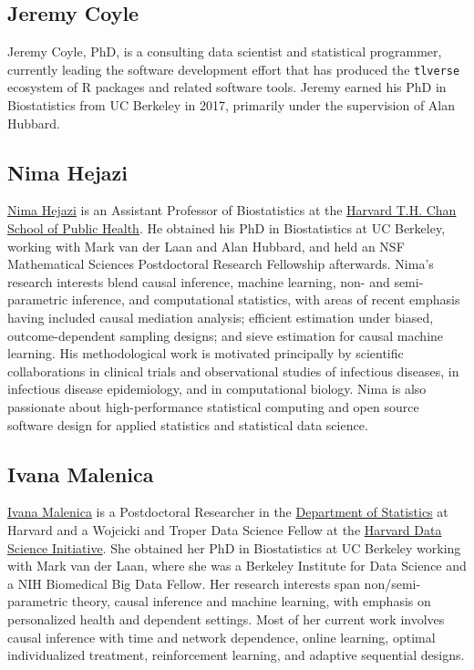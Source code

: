 \documentclass[
  12pt, krantz2,
]{krantz}
\newcommand{\passthrough}[1]{#1}
\newcommand{\1}{\mathbbm{1}}
\theoremstyle{definition}
\theoremstyle{definition}
\theoremstyle{definition}
\theoremstyle{definition}
\theoremstyle{remark}
\begin{document}
\hypertarget{jeremy-coyle}{%
\subsection*{Jeremy Coyle}\label{jeremy-coyle}}


Jeremy Coyle, PhD, is a consulting data scientist and statistical programmer,
currently leading the software development effort that has produced the
\passthrough{\lstinline!tlverse!} ecosystem of R packages and related software tools. Jeremy earned his
PhD in Biostatistics from UC Berkeley in 2017, primarily under the supervision
of Alan Hubbard.

\hypertarget{nima-hejazi}{%
\subsection*{Nima Hejazi}\label{nima-hejazi}}


\href{https://nimahejazi.org}{Nima Hejazi} is an Assistant Professor of Biostatistics
at the \href{https://www.hsph.harvard.edu/biostatistics/}{Harvard T.H. Chan School of Public
Health}. He obtained his PhD in
Biostatistics at UC Berkeley, working with Mark van der Laan and Alan Hubbard,
and held an NSF Mathematical Sciences Postdoctoral Research Fellowship
afterwards. Nima's research interests blend causal inference, machine learning,
non- and semi-parametric inference, and computational statistics, with areas of
recent emphasis having included causal mediation analysis; efficient estimation
under biased, outcome-dependent sampling designs; and sieve estimation for
causal machine learning. His methodological work is motivated principally by
scientific collaborations in clinical trials and observational studies of
infectious diseases, in infectious disease epidemiology, and in computational
biology. Nima is also passionate about high-performance statistical computing
and open source software design for applied statistics and statistical data
science.

\hypertarget{ivana-malenica}{%
\subsection*{Ivana Malenica}\label{ivana-malenica}}


\href{https://imalenica.github.io/}{Ivana Malenica} is a Postdoctoral Researcher in
the \href{https://statistics.fas.harvard.edu/}{Department of Statistics} at Harvard
and a Wojcicki and Troper Data Science Fellow at the \href{https://datascience.harvard.edu/}{Harvard Data Science
Initiative}. She obtained her PhD in
Biostatistics at UC Berkeley working with Mark van der Laan, where she was a
Berkeley Institute for Data Science and a NIH Biomedical Big Data Fellow. Her
research interests span non/semi-parametric theory, causal inference and machine
learning, with emphasis on personalized health and dependent settings. Most of
her current work involves causal inference with time and network dependence,
online learning, optimal individualized treatment, reinforcement learning, and
adaptive sequential designs.
\end{document}
